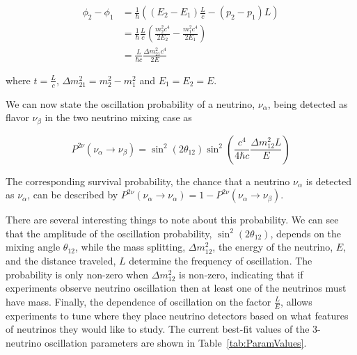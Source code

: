 \begin{equation}
\begin{split}
	\phi_2 - \phi_1 &= \frac{1}{\hbar}\left( (E_2 - E_1)\frac{L}{c} - (p_2 - p_1)L  \right)\\
	&=\frac{1}{\hbar}\frac{L}{c}\left(\frac{m_2^2c^4}{2E_2} - \frac{m_1^2c^4}{2E_1}\right) \\
	&=\frac{L}{\hbar c}\frac{\Delta m^2_{21}c^4}{2E}
\end{split}
\end{equation}

where $t = \frac{L}{c}$, $\Delta m^2_{21} = m_2^2 - m_1^2$ and $E_1 = E_2 = E$.

We can now state the oscillation probability of a neutrino, $\nu_\alpha$, being detected as flavor $\nu_\beta$ in the two neutrino mixing case as

\begin{equation}
	P^{2\nu}(\nu_\alpha \rightarrow \nu_\beta) = \sin^2\left(2\theta_{12}\right)\sin^2\left(\frac{c^4}{4\hbar c}\frac{\Delta m^2_{12}L}{E}\right) 
\end{equation}

The corresponding survival probability, the chance that a neutrino $\nu_\alpha$ is detected as $\nu_\alpha$, can be described by $P^{2\nu}(\nu_\alpha \rightarrow \nu_\alpha) = 1 - P^{2\nu}(\nu_\alpha \rightarrow \nu_\beta)$.

There are several interesting things to note about this probability. We can see that the amplitude of the oscillation probability, $\sin^2\left(2\theta_{12}\right)$, depends on the mixing angle $\theta_{12}$, while the mass splitting, $\Delta m^2_{12}$, the energy of the neutrino, $E$, and the distance traveled, $L$ determine the frequency of oscillation. 
The probability is only non-zero when $\Delta m^2_{12}$ is non-zero, indicating that if experiments observe neutrino oscillation then at least one of the neutrinos must have mass.
Finally, the dependence of oscillation on the factor $\frac{L}{E}$, allows experiments to tune where they place neutrino detectors based on what features of neutrinos they would like to study. 
The current best-fit values of the 3-neutrino oscillation parameters are shown in Table~\ref{tab:ParamValues}.


